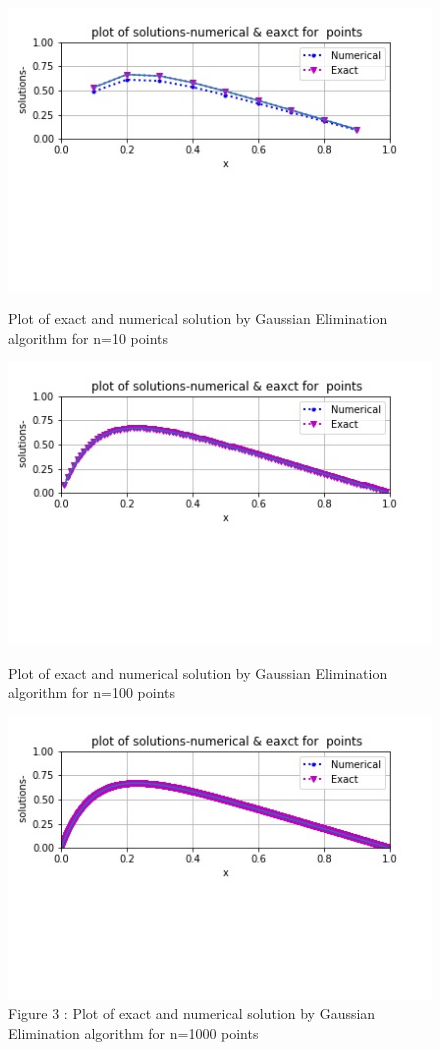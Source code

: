 \documentclass{article}
\begin{document}
\begin{figure}[h!]
\includegraphics{gaussop1}
\centering
\caption{ Plot of exact and numerical solution by Gaussian Elimination algorithm for n=10 points}
\label{}
\includegraphics{gaussop2}
\centering
\caption{ Plot of exact and numerical solution by Gaussian Elimination algorithm for n=100 points}
\label{}
\includegraphics{gaussop3}
\centering
\caption{Figure 3 : Plot of exact and numerical solution by Gaussian Elimination algorithm for n=1000 points}

\end{figure}
\end{document}
